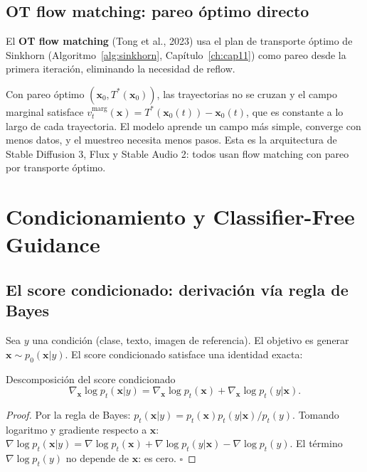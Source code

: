 \subsection{OT flow matching: pareo óptimo directo}
\label{subsec:ot_fm}

El \textbf{OT flow matching} (Tong et al., 2023) usa el plan de transporte
óptimo de Sinkhorn (Algoritmo~\ref{alg:sinkhorn}, Capítulo~\ref{ch:cap11}) como pareo
desde la primera iteración, eliminando la necesidad de reflow.

Con pareo óptimo $(\bm{x}_0, T^*(\bm{x}_0))$, las trayectorias no se cruzan y
el campo marginal satisface $v_t^{\mathrm{marg}}(\bm{x}) = T^*(\bm{x}_0(t)) -
\bm{x}_0(t)$, que es constante a lo largo de cada trayectoria. El modelo aprende
un campo más simple, converge con menos datos, y el muestreo necesita menos
pasos. Esta es la arquitectura de Stable Diffusion 3, Flux y Stable Audio 2:
todos usan flow matching con pareo por transporte óptimo.

\section{Condicionamiento y Classifier-Free Guidance}
\label{sec:cfg}

\subsection{El score condicionado: derivación vía regla de Bayes}
\label{subsec:score_condicionado}

Sea $y$ una condición (clase, texto, imagen de referencia). El objetivo es
generar $\bm{x}\sim p_0(\bm{x}|y)$. El score condicionado satisface una
identidad exacta:

\begin{proposicion}{Descomposición del score condicionado}
\label{prop:score_condicionado}
\begin{equation}
  \nabla_{\bm{x}}\log p_t(\bm{x}|y)
  = \nabla_{\bm{x}}\log p_t(\bm{x})
  + \nabla_{\bm{x}}\log p_t(y|\bm{x}).
  \label{eq:score_condicionado}
\end{equation}
\end{proposicion}

\begin{proof}
Por la regla de Bayes: $p_t(\bm{x}|y) = p_t(\bm{x})p_t(y|\bm{x})/p_t(y)$.
Tomando logaritmo y gradiente respecto a $\bm{x}$:
$\nabla\log p_t(\bm{x}|y) = \nabla\log p_t(\bm{x}) + \nabla\log p_t(y|\bm{x})
- \nabla\log p_t(y)$.
El término $\nabla\log p_t(y)$ no depende de $\bm{x}$: es cero. $\square$
\end{proof}

